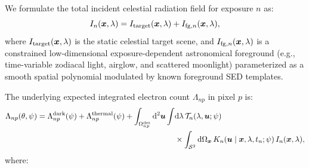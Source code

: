 \documentclass[11pt,a4paper]{article}
\begin{document}
We formulate the total incident celestial radiation field for exposure $n$ as:
\begin{equation}
I_n(\boldsymbol{x}, \lambda) = I_{\rm target}(\boldsymbol{x}, \lambda) + I_{{\rm fg}, n}(\boldsymbol{x}, \lambda),
\end{equation}
where $I_{\rm target}(\boldsymbol{x}, \lambda)$ is the static celestial target scene, and $I_{{\rm fg}, n}(\boldsymbol{x}, \lambda)$ is a constrained low-dimensional exposure-dependent astronomical foreground (e.g., time-variable zodiacal light, airglow, and scattered moonlight) parameterized as a smooth spatial polynomial modulated by known foreground SED templates.

The underlying expected integrated electron count $\Lambda_{np}$ in pixel $p$ is:
\begin{equation}
\begin{aligned}
\Lambda_{np}(\theta, \psi) = \Lambda_{np}^{\rm dark}(\psi) + \Lambda_{np}^{\rm thermal}(\psi) + \int_{\Omega_{np}^{\rm det}} \mathrm{d}^2\boldsymbol{u} \int & \mathrm{d}\lambda \, \mathcal{T}_n(\lambda, \boldsymbol{u}; \psi) \\
& \times \int_{\mathcal{S}^2} \mathrm{d}\Omega_{\boldsymbol{x}} \, K_n(\boldsymbol{u} \mid \boldsymbol{x}, \lambda, t_n; \psi) \, I_n(\boldsymbol{x}, \lambda),
\end{aligned}
\label{eq:forward_exact}
\end{equation}
where:
\end{document}
